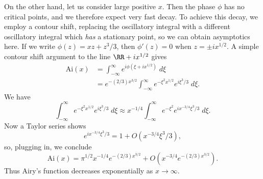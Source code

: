 \begin{example}
  On the other hand, let us consider large positive $x$. Then the phase $\phi$ has no critical points, and we therefore expect very fast decay. To achieve this decay, we employ a contour shift, replacing the oscillatory integral with a different oscillatory integral which \emph{has} a stationary point, so we can obtain asymptotics here. If we write $\phi(z) = xz + z^3/3$, then $\phi'(z) = 0$ when $z = \pm i x^{1/2}$. A simple contour shift argument to the line $\RR + i x^{1/2}$ gives
  \begin{align*}
    \text{Ai}(x) &= \int_{-\infty}^\infty e^{i \phi(\xi + ix^{1/2})}\; d\xi\\
    &= e^{-(2/3)x^{3/2}} \int_{-\infty}^\infty e^{-\xi^2 x^{1/2}} e^{i \xi^3/3}\; d\xi.
  \end{align*}
  We have
  \[ \int_{-\infty}^\infty e^{-\xi^2 x^{1/2}} e^{i \xi^3/3}\; d\xi \approx x^{-1/4} \int_{-\infty}^\infty e^{-\xi^2} e^{i x^{-3/4} \xi^3/3}\; d\xi. \]
  Now a Taylor series shows
  \[ e^{i x^{-3/4} \xi^3/3} = 1 + O(x^{-3/4} \xi^3/3), \]
  so, plugging in, we conclude
  \[ \text{Ai}(x) = \pi^{1/2} x^{-1/4} e^{-(2/3) x^{3/2}} + O(x^{-3/4} e^{-(2/3) x^{3/2}}). \]
  Thus Airy's function decreases exponentially as $x \to \infty$.
\end{example}


